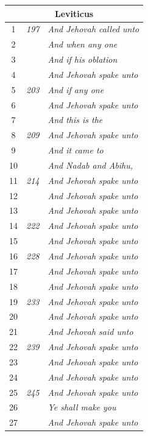 \documentclass{article}
\newlength{\minipageheight}
\newlength{\minipagewidth}
\begin{document}
\begin{minipage}[r][\minipageheight][t]{\minipagewidth}
\begin{longtable}{ccl}
        \multicolumn{3}{c}{\textbf{Leviticus}}                         \\
        \hline
        1           & \textit{197} & \textit{And Jehovah called unto}  \\
        2           &              & \textit{And when any one}         \\
        3           &              & \textit{And if his oblation}      \\
        4           &              & \textit{And Jehovah spake unto}   \\
        5           & \textit{203} & \textit{And if any one}           \\
        6           &              & \textit{And Jehovah spake unto}   \\
        7           &              & \textit{And this is the}          \\
        8           & \textit{209} & \textit{And Jehovah spake unto}   \\
        9           &              & \textit{And it came to}           \\
        10          &              & \textit{And Nadab and Abihu,}     \\
        11          & \textit{214} & \textit{And Jehovah spake unto}   \\
        12          &              & \textit{And Jehovah spake unto}   \\
        13          &              & \textit{And Jehovah spake unto}   \\
        14          & \textit{222} & \textit{And Jehovah spake unto}   \\
        15          &              & \textit{And Jehovah spake unto}   \\
        16          & \textit{228} & \textit{And Jehovah spake unto}   \\
        17          &              & \textit{And Jehovah spake unto}   \\
        18          &              & \textit{And Jehovah spake unto}   \\
        19          & \textit{233} & \textit{And Jehovah spake unto}   \\
        20          &              & \textit{And Jehovah spake unto}   \\
        21          &              & \textit{And Jehovah said unto}    \\
        22          & \textit{239} & \textit{And Jehovah spake unto}   \\
        23          &              & \textit{And Jehovah spake unto}   \\
        24          &              & \textit{And Jehovah spake unto}   \\
        25          & \textit{245} & \textit{And Jehovah spake unto}   \\
        26          &              & \textit{Ye shall make you}        \\
        27          &              & \textit{And Jehovah spake unto}   \\


\end{longtable}
\end{minipage}
\end{document}
